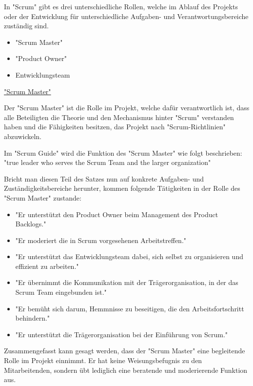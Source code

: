 \pagebreak


In "Scrum" gibt es drei unterschiedliche Rollen, welche im Ablauf des Projekts oder der Entwicklung für unterschiedliche Aufgaben- und Verantwortungsbereiche zuständig sind.

\begin{itemize}
    \item "Scrum Master"
    \item "Product Owner"
    \item Entwicklungsteam
\end{itemize}

\cite{Scrum}

\underline{"Scrum Master"}

Der "Scrum Master" ist die Rolle im Projekt, welche dafür verantwortlich ist, dass alle Beteiligten die Theorie und den Mechanismus hinter "Scrum" verstanden haben und die Fähigkeiten besitzen, das Projekt nach "Scrum-Richtlinien" abzuwickeln. \cite{ScrumMaster}

Im "Scrum Guide" wird die Funktion des "Scrum Master" wie folgt beschrieben: "true leader who serves the Scrum Team and the larger organization" \cite{ScrumMaster}

Bricht man diesen Teil des Satzes nun auf konkrete Aufgaben- und Zuständigkeitsbereiche herunter, kommen folgende Tätigkeiten in der Rolle des "Scrum Master" zustande:

\begin{itemize}
    \item "Er unterstützt den Product Owner beim Management des Product Backlogs." \cite{ScrumMaster}
    \item "Er moderiert die in Scrum vorgesehenen Arbeitstreffen." \cite{ScrumMaster}
    \item "Er unterstützt das Entwicklungsteam dabei, sich selbst zu organisieren und effizient zu arbeiten." \cite{ScrumMaster}
    \item "Er übernimmt die Kommunikation mit der Trägerorganisation, in der das Scrum Team eingebunden ist." \cite{ScrumMaster}
    \item "Er bemüht sich darum, Hemmnisse zu beseitigen, die den Arbeitsfortschritt behindern." \cite{ScrumMaster}
    \item "Er unterstützt die Trägerorganisation bei der Einführung von Scrum." \cite{ScrumMaster}
\end{itemize}

Zusammengefasst kann gesagt werden, dass der "Scrum Master" eine begleitende Rolle im Projekt einnimmt. Er hat keine Weisungsbefugnis zu den Mitarbeitenden, sondern übt lediglich eine beratende und moderierende Funktion aus. \cite{ScrumMaster}


